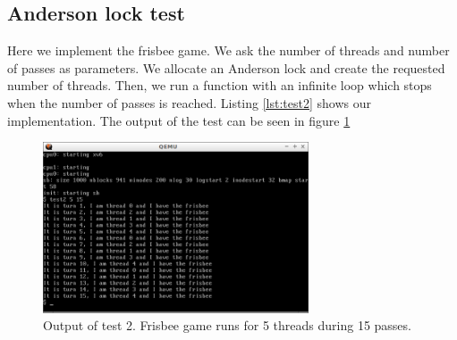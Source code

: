 \documentclass[10pt]{scrartcl}
\begin{document}
\subsection{Anderson lock test}
Here we implement the frisbee game.  We ask the number of threads and number of passes as parameters. We allocate an Anderson lock and create the requested number of threads. Then, we run a function with an infinite loop which stops when the number of passes is reached.  Listing \ref{lst:test2} shows our implementation.  The output of the test can be seen in figure \ref{fig:test2}


\begin{figure}
  \centering
  \includegraphics[width=0.7\textwidth]{figures/test2.png}
  \caption{Output of test 2.  Frisbee game runs for 5 threads during 15 passes.}\label{fig:test2}
\end{figure}
\end{document}

